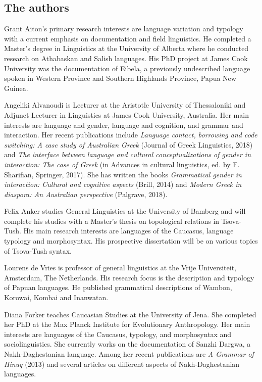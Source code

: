 \begin{refsection}
\section*{The authors}

Grant Aiton's primary research interests are language variation and typology with a current emphasis on documentation and field linguistics. He completed a Master's degree in Linguistics at the University of Alberta where he conducted research on Athabaskan and Salish languages. His PhD project at James Cook University was the documentation of Eibela, a previously undescribed language spoken in Western Province and Southern Highlands Province, Papua New Guinea. 

Angeliki Alvanoudi is Lecturer at the Aristotle University of Thessaloniki and Adjunct Lecturer in Linguistics at James Cook University, Australia. Her main interests are language and gender, language and cognition, and grammar and interaction. Her recent publications include \textit{Language contact, borrowing and code switching: A case study of Australian Greek} (Journal of Greek Linguistics, 2018) and \textit{The interface between language and cultural conceptualizations of gender in interaction: The case of Greek} (in Advances in cultural linguistics, ed. by F. Sharifian, Springer, 2017). She has written the books \textit{Grammatical gender in interaction: Cultural and cognitive aspects} (Brill, 2014) and \textit{Modern Greek in diaspora: An Australian perspective} (Palgrave, 2018).  

Felix Anker studies General Linguistics at the University of Bamberg and will complete his studies with a Master’s thesis on topological relations in Tsova-Tush. His main research interests are languages of the Caucasus, language typology and morphosyntax. His prospective dissertation will be on various topics of Tsova-Tush syntax.

Lourens de Vries is professor of general linguistics at the Vrije Universiteit, Amsterdam, The Netherlands. His research focus is the description and typology of Papuan languages. He published grammatical descriptions of Wambon, Korowai, Kombai and Inanwatan. 

Diana Forker teaches Caucasian Studies at the University of Jena. She completed her PhD at the Max Planck Institute for Evolutionary Anthropology. Her main interests are languages of the Caucasus, typology, and morphosyntax and sociolinguistics. She currently works on the documentation of Sanzhi Dargwa, a Nakh-Daghestanian language. Among her recent publications are \textit{A Grammar of Hinuq} (2013) and several articles on different aspects of Nakh-Daghestanian languages.  


\end{refsection}
